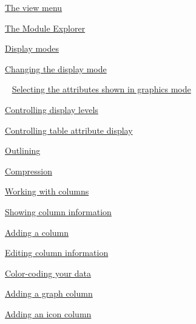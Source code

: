 \documentclass[11pt,a4paper]{article}
\begin{document}
\href{https://www.ibm.com/support/knowledgecenter/search/The%20view%20menu?scope=SSYQBZ_9.6.1}{The view menu}

\href{https://www.ibm.com/support/knowledgecenter/search/The%20Module%20Explorer?scope=SSYQBZ_9.6.1}{The Module Explorer}

\href{https://www.ibm.com/support/knowledgecenter/search/Display%20modes?scope=SSYQBZ_9.6.1}{Display modes}

\href{https://www.ibm.com/support/knowledgecenter/search/Changing%20the%20display%20mode?scope=SSYQBZ_9.6.1}{Changing the display mode}

\,\,\, \href{https://www.ibm.com/support/knowledgecenter/search/Selecting%20the%20attributes%20shown%20in%20graphics%20mode?scope=SSYQBZ_9.6.1}{Selecting the attributes shown in graphics mode}

\href{https://www.ibm.com/support/knowledgecenter/search/Controlling%20display%20levels?scope=SSYQBZ_9.6.1}{Controlling display levels}

\href{https://www.ibm.com/support/knowledgecenter/search/Controlling%20table%20attribute%20display?scope=SSYQBZ_9.6.1}{Controlling table attribute display}

\href{https://www.ibm.com/support/knowledgecenter/search/Outlining?scope=SSYQBZ_9.6.1}{Outlining}

\href{https://www.ibm.com/support/knowledgecenter/search/Compression?scope=SSYQBZ_9.6.1}{Compression}

\href{https://www.ibm.com/support/knowledgecenter/search/Working%20with%20columns?scope=SSYQBZ_9.6.1}{Working with columns}

\href{https://www.ibm.com/support/knowledgecenter/search/Showing%20column%20information?scope=SSYQBZ_9.6.1}{Showing column information}

\href{https://www.ibm.com/support/knowledgecenter/search/Adding%20a%20column?scope=SSYQBZ_9.6.1}{Adding a column}

\href{https://www.ibm.com/support/knowledgecenter/search/Editing%20column%20information?scope=SSYQBZ_9.6.1}{Editing column information}

\href{https://www.ibm.com/support/knowledgecenter/search/Color-coding%20your%20data?scope=SSYQBZ_9.6.1}{Color-coding your data}

\href{https://www.ibm.com/support/knowledgecenter/search/Adding%20a%20graph%20column?scope=SSYQBZ_9.6.1}{Adding a graph column}

\href{https://www.ibm.com/support/knowledgecenter/search/Adding%20an%20icon%20column?scope=SSYQBZ_9.6.1}{Adding an icon column} \\
\end{document}
